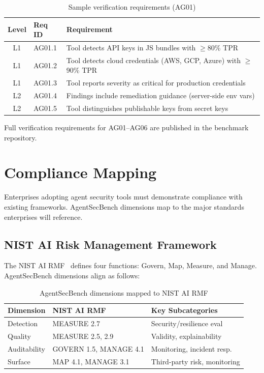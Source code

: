 \documentclass[11pt,twocolumn]{article}
\begin{document}
\begin{table}[H]
\centering
\caption{Sample verification requirements (AG01)}
\label{tab:verification}
\scriptsize
\begin{tabular}{@{}clp{4.2cm}@{}}
\toprule
\textbf{Level} & \textbf{Req ID} & \textbf{Requirement} \\
\midrule
L1 & AG01.1 & Tool detects API keys in JS bundles with $\geq$80\% TPR \\
L1 & AG01.2 & Tool detects cloud credentials (AWS, GCP, Azure) with $\geq$90\% TPR \\
L1 & AG01.3 & Tool reports severity as critical for production credentials \\
L2 & AG01.4 & Findings include remediation guidance (server-side env vars) \\
L2 & AG01.5 & Tool distinguishes publishable keys from secret keys \\
\bottomrule
\end{tabular}
\end{table}

Full verification requirements for AG01--AG06 are published in the benchmark repository.

\section{Compliance Mapping}
\label{sec:compliance}

Enterprises adopting agent security tools must demonstrate compliance with existing frameworks. AgentSecBench dimensions map to the major standards enterprises will reference.

\subsection{NIST AI Risk Management Framework}

The NIST AI RMF~\cite{nistairm} defines four functions: Govern, Map, Measure, and Manage. AgentSecBench dimensions align as follows:

\begin{table}[H]
\centering
\caption{AgentSecBench dimensions mapped to NIST AI RMF}
\label{tab:nist}
\scriptsize
\begin{tabular}{@{}lll@{}}
\toprule
\textbf{Dimension} & \textbf{NIST AI RMF} & \textbf{Key Subcategories} \\
\midrule
Detection & MEASURE 2.7 & Security/resilience eval \\
Quality & MEASURE 2.5, 2.9 & Validity, explainability \\
Auditability & GOVERN 1.5, MANAGE 4.1 & Monitoring, incident resp. \\
Surface & MAP 4.1, MANAGE 3.1 & Third-party risk, monitoring \\
\bottomrule
\end{tabular}
\end{table}
\end{document}
